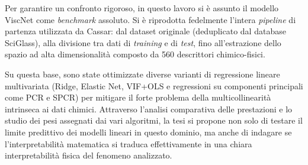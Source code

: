 \documentclass[../main.tex]{subfiles}
\begin{document}
	Per garantire un confronto rigoroso, in questo lavoro si è assunto il modello ViscNet come \textit{benchmark} assoluto. Si è riprodotta fedelmente l'intera \textit{pipeline} di partenza utilizzata da Cassar: dal dataset originale (deduplicato dal database SciGlass), alla divisione tra dati di \textit{training} e di \textit{test}, fino all'estrazione dello spazio ad alta dimensionalità composto da 560 descrittori chimico-fisici. 
	
	Su questa base, sono state ottimizzate diverse varianti di regressione lineare multivariata (Ridge, Elastic Net, VIF+OLS e regressioni su componenti principali come PCR e SPCR) per mitigare il forte problema della multicollinearità intrinseca ai dati chimici. Attraverso l'analisi comparativa delle prestazioni e lo studio dei pesi assegnati dai vari algoritmi, la tesi si propone non solo di testare il limite predittivo dei modelli lineari in questo dominio, ma anche di indagare se l'interpretabilità matematica si traduca effettivamente in una chiara interpretabilità fisica del fenomeno analizzato.
	
\end{document}
